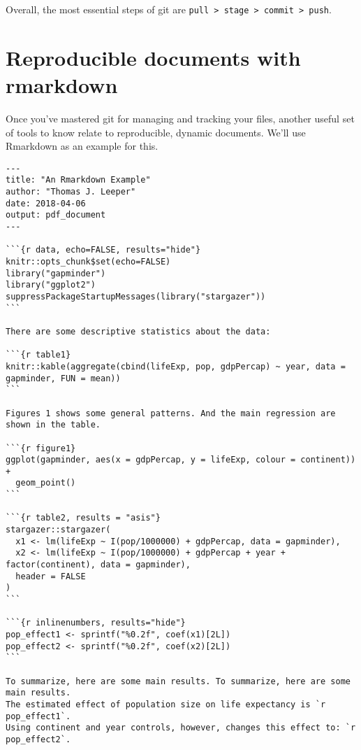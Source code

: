 \documentclass[12pt, a4paper]{article}
\begin{document}
\noindent Overall, the most essential steps of git are \texttt{pull > stage > commit > push}.

\section{Reproducible documents with rmarkdown}

Once you've mastered git for managing and tracking your files, another useful set of tools to know relate to reproducible, dynamic documents. We'll use Rmarkdown as an example for this.

\footnotesize 
\begin{verbatim}
---
title: "An Rmarkdown Example"
author: "Thomas J. Leeper"
date: 2018-04-06
output: pdf_document
---

```{r data, echo=FALSE, results="hide"}
knitr::opts_chunk$set(echo=FALSE)
library("gapminder")
library("ggplot2")
suppressPackageStartupMessages(library("stargazer"))
```

There are some descriptive statistics about the data:

```{r table1}
knitr::kable(aggregate(cbind(lifeExp, pop, gdpPercap) ~ year, data = gapminder, FUN = mean))
```

Figures 1 shows some general patterns. And the main regression are shown in the table.

```{r figure1}
ggplot(gapminder, aes(x = gdpPercap, y = lifeExp, colour = continent)) + 
  geom_point()
```
  
```{r table2, results = "asis"}
stargazer::stargazer(
  x1 <- lm(lifeExp ~ I(pop/1000000) + gdpPercap, data = gapminder),
  x2 <- lm(lifeExp ~ I(pop/1000000) + gdpPercap + year + factor(continent), data = gapminder),
  header = FALSE
)
```

```{r inlinenumbers, results="hide"}
pop_effect1 <- sprintf("%0.2f", coef(x1)[2L])
pop_effect2 <- sprintf("%0.2f", coef(x2)[2L])
```

To summarize, here are some main results. To summarize, here are some main results. 
The estimated effect of population size on life expectancy is `r pop_effect1`.
Using continent and year controls, however, changes this effect to: `r pop_effect2`.
\end{verbatim}
\end{document}
